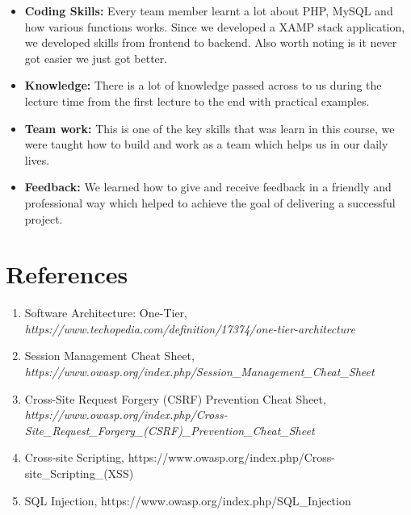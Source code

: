 \documentclass[12pt,a4paper]{article}
\begin{document}
		\begin{itemize}
		\item \textbf{Coding Skills:} Every team member learnt a lot about PHP, MySQL and how various functions works. Since we developed a XAMP stack application, we developed skills from frontend to backend. Also worth noting is it never got easier we just got better.
		\item \textbf{Knowledge:} There is a lot of knowledge passed across to us during the lecture time from the first lecture to the end with practical examples.
		\item \textbf{Team work:} This is one of the key skills that was learn in this course, we were taught how to build and work as a
		team which helps us in our daily lives.
		\item \textbf{Feedback:} We learned how to give and receive feedback in a friendly and professional way which helped to achieve the goal of delivering a successful project.
		\end{itemize}
		
	
	\section{References}
	
\begin{flushleft}
		\begin{enumerate}
		\item Software Architecture: One-Tier, \textit{https://www.techopedia.com/definition/17374/one-tier-architecture}
		\item Session Management Cheat Sheet, \textit{https://www.owasp.org/index.php/Session\_Management\_Cheat\_Sheet}
		\item Cross-Site Request Forgery (CSRF) Prevention Cheat Sheet, \textit{https://www.owasp.org/index.php/Cross-Site\_Request\_Forgery\_(CSRF)\_Prevention\_Cheat\_Sheet}
		\item Cross-site Scripting, https://www.owasp.org/index.php/Cross-site\_Scripting\_(XSS)
		\item SQL Injection, https://www.owasp.org/index.php/SQL\_Injection
	\end{enumerate}
\end{flushleft}
	
		
	
\end{document}

